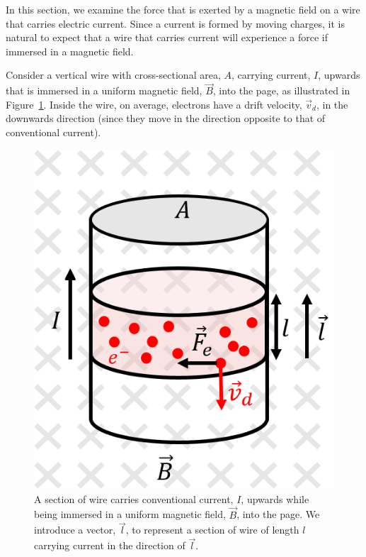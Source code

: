 In this section, we examine the force that is exerted by a magnetic field on a wire that carries electric current. Since a current is formed by moving charges, it is natural to expect that a wire that carries current will experience a force if immersed in a magnetic field.

Consider a vertical wire with cross-sectional area, $A$, carrying current, $I$, upwards that is immersed in a uniform magnetic field, $\vec B$, into the page, as illustrated in Figure~\ref{fig:magneticforce:microforce}. Inside the wire, on average, electrons have a drift velocity, $\vec v_d$, in the downwards direction (since they move in the direction opposite to that of conventional current).

\begin{figure}[!htbp]
\centering
\includegraphics[width=0.3\linewidth]{files/microforce-e8a90f317eda4fec4aff9ff43bc985d4.png}
\caption[]{A section of wire carries conventional current, $I$, upwards while being immersed in a uniform magnetic field, $\vec B$, into the page. We introduce a vector, $\vec l$, to represent a section of wire of length $l$ carrying current in the direction of $\vec l$.}
\label{fig:magneticforce:microforce}
\end{figure}

